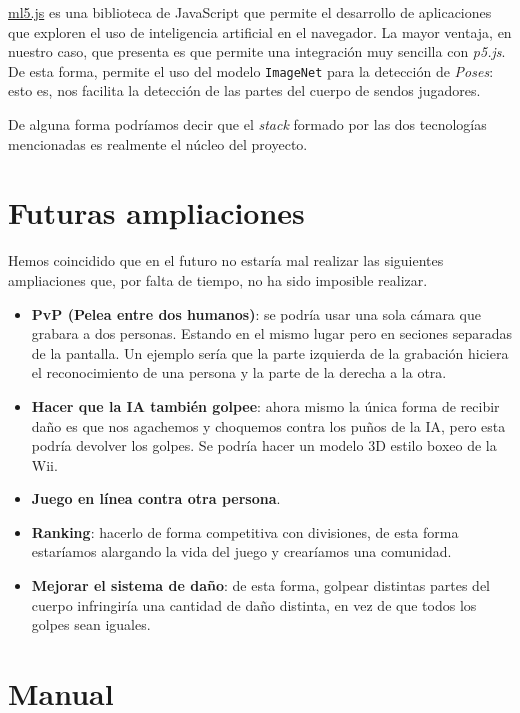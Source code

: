 \documentclass{article}
\begin{document}
\href{https://ml5js.org/}{ml5.js} es una biblioteca de JavaScript que permite el desarrollo de aplicaciones que exploren el uso de inteligencia artificial en el navegador. La mayor ventaja, en nuestro caso, que presenta es que permite una integración muy sencilla con \textit{p5.js}. De esta forma, permite el uso del modelo \texttt{ImageNet} para la detección de \textit{Poses}: esto es, nos facilita la detección de las partes del cuerpo de sendos jugadores.

De alguna forma podríamos decir que el \textit{stack} formado por las dos tecnologías mencionadas es realmente el núcleo del proyecto.

\section{Futuras ampliaciones}

Hemos coincidido que en el futuro no estaría mal realizar las siguientes ampliaciones que, por falta de tiempo, no ha sido imposible realizar.

\begin{itemize}
    \item \textbf{PvP (Pelea entre dos humanos)}: se podría usar una sola cámara que grabara a dos personas. Estando en el mismo lugar pero en seciones separadas de la pantalla. Un ejemplo sería que la parte izquierda de la grabación hiciera el reconocimiento de una persona y la parte de la derecha a la otra.
    \item \textbf{Hacer que la IA también golpee}: ahora mismo la única forma de recibir daño es que nos agachemos y choquemos contra los puños de la IA, pero esta podría devolver los golpes. Se podría hacer un modelo 3D estilo boxeo de la Wii.
    \item \textbf{Juego en línea contra otra persona}.
    \item \textbf{Ranking}: hacerlo de forma competitiva con divisiones, de esta forma estaríamos alargando la vida del juego y crearíamos una comunidad.
    \item \textbf{Mejorar el sistema de daño}: de esta forma, golpear distintas partes del cuerpo infringiría una cantidad de daño distinta, en vez de que todos los golpes sean iguales.
\end{itemize}

\section{Manual}
\label{section:manual}
\end{document}
